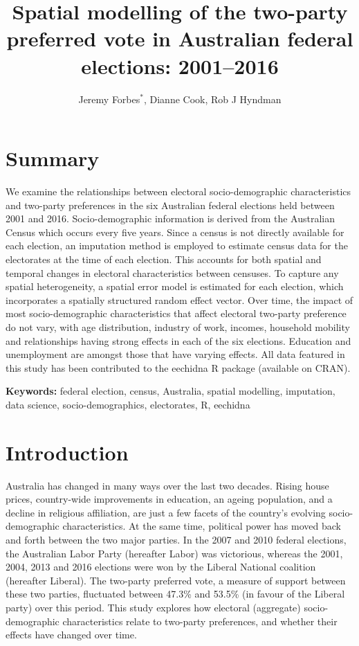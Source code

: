 \documentclass[
  times, doublespace]{anzsauth}
\title{Spatial modelling of the two-party preferred vote in Australian federal elections: 2001--2016}
\author{Jeremy Forbes\(^*\), Dianne Cook, Rob J Hyndman}
\date{}
\let\oldmaketitle\maketitle
\def\maketitle{\cleanlookdateon\oldmaketitle}
\begin{document}
\maketitle

\hypertarget{summary}{%
\section*{Summary}\label{summary}}

We examine the relationships between electoral socio-demographic characteristics and two-party preferences in the six Australian federal elections held between 2001 and 2016. Socio-demographic information is derived from the Australian Census which occurs every five years. Since a census is not directly available for each election, an imputation method is employed to estimate census data for the electorates at the time of each election. This accounts for both spatial and temporal changes in electoral characteristics between censuses. To capture any spatial heterogeneity, a spatial error model is estimated for each election, which incorporates a spatially structured random effect vector. Over time, the impact of most socio-demographic characteristics that affect electoral two-party preference do not vary, with age distribution, industry of work, incomes, household mobility and relationships having strong effects in each of the six elections. Education and unemployment are amongst those that have varying effects. All data featured in this study has been contributed to the \textsf{eechidna} \textsf{R} package (available on CRAN).

\textbf{Keywords:} federal election, census, Australia, spatial modelling, imputation, data science, socio-demographics, electorates, R, eechidna

\hypertarget{intro}{%
\section{Introduction}\label{intro}}

Australia has changed in many ways over the last two decades. Rising house prices, country-wide improvements in education, an ageing population, and a decline in religious affiliation, are just a few facets of the country's evolving socio-demographic characteristics. At the same time, political power has moved back and forth between the two major parties. In the 2007 and 2010 federal elections, the Australian Labor Party (hereafter Labor) was victorious, whereas the 2001, 2004, 2013 and 2016 elections were won by the Liberal National coalition (hereafter Liberal). The two-party preferred vote, a measure of support between these two parties, fluctuated between 47.3\% and 53.5\% (in favour of the Liberal party) over this period. This study explores how electoral (aggregate) socio-demographic characteristics relate to two-party preferences, and whether their effects have changed over time.
\end{document}
